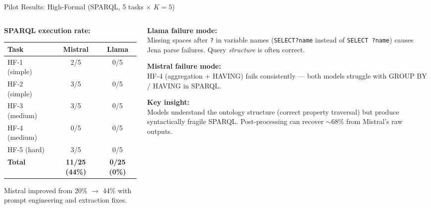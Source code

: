 \documentclass[aspectratio=169]{beamer}
\begin{document}
\begin{frame}{Pilot Results: High-Formal (SPARQL, 5 tasks $\times$ $K\!=\!5$)}

\begin{columns}[T]
\begin{column}{0.48\textwidth}
\textbf{SPARQL execution rate:}\\[0.3em]
{\small
\begin{tabular}{@{}lcc@{}}
\toprule
Task & Mistral & Llama \\
\midrule
HF-1 (simple) & 2/5 & 0/5 \\
HF-2 (simple) & 3/5 & 0/5 \\
HF-3 (medium) & 3/5 & 0/5 \\
HF-4 (medium) & 0/5 & 0/5 \\
HF-5 (hard) & 3/5 & 0/5 \\
\midrule
\textbf{Total} & \textbf{11/25 (44\%)} & \textbf{0/25 (0\%)} \\
\bottomrule
\end{tabular}
}

\vspace{0.5em}
{\small Mistral improved from 20\% $\rightarrow$ 44\% with prompt engineering and extraction fixes.}
\end{column}

\begin{column}{0.48\textwidth}
\textbf{Llama failure mode:}\\[0.3em]
{\small Missing spaces after \texttt{?} in variable names (\texttt{SELECT?name} instead of \texttt{SELECT~?name}) causes Jena parse failures. Query \emph{structure} is often correct.}

\vspace{0.8em}
\textbf{Mistral failure mode:}\\[0.3em]
{\small HF-4 (aggregation + HAVING) fails consistently --- both models struggle with GROUP BY / HAVING in SPARQL.}

\vspace{0.8em}
\textbf{Key insight:}\\
{\small Models understand the ontology structure (correct property traversal) but produce syntactically fragile SPARQL. Post-processing can recover ${\sim}68\%$ from Mistral's raw outputs.}
\end{column}
\end{columns}

\end{frame}
\end{document}

